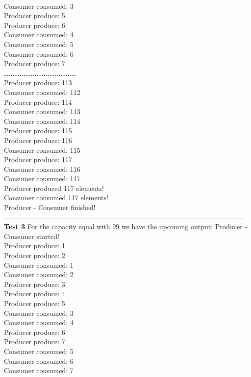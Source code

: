 \documentclass[14pt]{article}
\begin{document}
\\Consumer consumed: 3
\\Producer produce: 5
\\Producer produce: 6
\\Consumer consumed: 4
\\Consumer consumed: 5
\\Consumer consumed: 6
\\Producer produce: 7
\\\textbf{.................................}
\\Producer produce: 113
\\Consumer consumed: 112
\\Producer produce: 114
\\Consumer consumed: 113
\\Consumer consumed: 114
\\Producer produce: 115
\\Producer produce: 116
\\Consumer consumed: 115
\\Producer produce: 117
\\Consumer consumed: 116
\\Consumer consumed: 117
\\Producer produced 117 elements!
\\Consumer consumed 117 elements!
\\Producer - Consumer finished!
\\---------------------------------------------------------------------------------------------------------
\\\textbf{Test 3}
For the capacity equal with 99 we have the upcoming output:
Producer - Consumer started!
\\Producer produce: 1
\\Producer produce: 2
\\Consumer consumed: 1
\\Consumer consumed: 2
\\Producer produce: 3
\\Producer produce: 4
\\Producer produce: 5
\\Consumer consumed: 3
\\Consumer consumed: 4
\\Producer produce: 6
\\Producer produce: 7
\\Consumer consumed: 5
\\Consumer consumed: 6
\\Consumer consumed: 7
\end{document}
